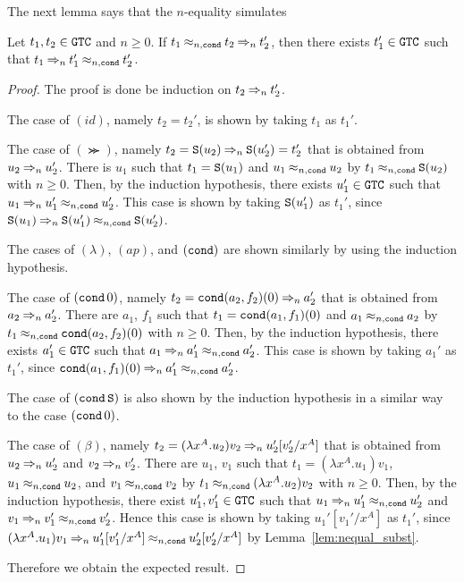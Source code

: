The next lemma says that the $n$-equality simulates 
\begin{lemma}\label{lem:parallel_eq}
  Let $t_1, t_2 \in {\tt GTC}$ and $n\ge 0$.
  If $t_1 \mathbin{\approx_{n,{\tt cond}}} t_2 \mathbin{\Rightarrow_{n}} t_2'$,
  then there exists $t_1'\in {\tt GTC}$ such that $t_1 \mathbin{\Rightarrow_{n}} t_1' \mathbin{\approx_{n,{\tt cond}}} t_2'$.
\end{lemma}
\begin{proof}
  The proof is done be induction on $t_2 \mathbin{\Rightarrow_{n}} t_2'$.
  
  The case of $(id)$, namely $t_2=t_2'$, is shown by taking $t_1$ as $t_1'$.
  
  The case of $(\Succ)$, namely $t_2={\tt S}(u_2) \mathbin{\Rightarrow_{n}} {\tt S}(u_2')=t_2'$ that is obtained
  from $u_2\mathbin{\Rightarrow_{n}} u_2'$. 
  There is $u_1$ such that $t_1 = {\tt S}(u_1)$ and $u_1\mathbin{\approx_{n,{\tt cond}}} u_2$ by $t_1 \mathbin{\approx_{n,{\tt cond}}} {\tt S}(u_2)$ with $n\ge 0$.
  Then, by the induction hypothesis,
  there exists $u_1'\in{\tt GTC}$ such that $u_1 \mathbin{\Rightarrow_{n}} u_1' \mathbin{\approx_{n,{\tt cond}}} u_2'$.  
  This case is shown by taking ${\tt S}(u_1')$ as $t_1'$,
  since ${\tt S}(u_1) \mathbin{\Rightarrow_{n}} {\tt S}(u_1') \mathbin{\approx_{n,{\tt cond}}} {\tt S}(u_2')$.
  
  The cases of $(\lambda)$, $(ap)$, and $({\tt cond})$ are shown similarly by using the induction hypothesis.
  
  The case of $({\tt cond}\,0)$, namely $t_2 = {\tt cond}(a_2,f_2)(0) \mathbin{\Rightarrow_{n}} a_2'$ that is
  obtained from $a_2 \mathbin{\Rightarrow_{n}} a_2'$.
  There are $a_1$, $f_1$ such that $t_1 = {\tt cond}(a_1,f_1)(0)$ and $a_1 \mathbin{\approx_{n,{\tt cond}}} a_2$
  by $t_1 \mathbin{\approx_{n,{\tt cond}}} {\tt cond}(a_2,f_2)(0)$ with $n\ge 0$.
  Then, by the induction hypothesis,
  there exists $a_1'\in{\tt GTC}$ such that $a_1 \mathbin{\Rightarrow_{n}} a_1' \mathbin{\approx_{n,{\tt cond}}} a_2'$.  
  This case is shown by taking $a_1'$ as $t_1'$,
  since ${\tt cond}(a_1,f_1)(0) \mathbin{\Rightarrow_{n}} a_1' \mathbin{\approx_{n,{\tt cond}}} a_2'$.  

  The case of $({\tt cond}\,{\tt S})$ is also shown by the induction hypothesis in a similar way to the case $({\tt cond}\,0)$.
  
  The case of $(\beta)$, namely $t_2 = (\lambda x^A.u_2)v_2 \mathbin{\Rightarrow_{n}} u_2'[v_2'/x^A]$ that is 
  obtained from $u_2 \mathbin{\Rightarrow_{n}} u_2'$ and $v_2 \mathbin{\Rightarrow_{n}} v_2'$.
  There are $u_1$, $v_1$ such that $t_1 = (\lambda x^A.u_1)v_1$, $u_1 \mathbin{\approx_{n,{\tt cond}}} u_2$, and $v_1 \mathbin{\approx_{n,{\tt cond}}} v_2$
  by $t_1 \mathbin{\approx_{n,{\tt cond}}} (\lambda x^A.u_2)v_2$ with $n\ge 0$.
  Then, by the induction hypothesis,
  there exist $u_1',v_1'\in{\tt GTC}$ such that $u_1 \mathbin{\Rightarrow_{n}} u_1' \mathbin{\approx_{n,{\tt cond}}} u_2'$ and
  $v_1 \mathbin{\Rightarrow_{n}} v_1' \mathbin{\approx_{n,{\tt cond}}} v_2'$.
  Hence this case is shown by taking $u_1'[v_1'/x^A]$ as $t_1'$,
  since $(\lambda x^A.u_1)v_1 \mathbin{\Rightarrow_{n}} u_1'[v_1'/x^A] \mathbin{\approx_{n,{\tt cond}}} u_2'[v_2'/x^A]$ by Lemma~\ref{lem:nequal_subst}.
  
  Therefore we obtain the expected result. 
\end{proof}

